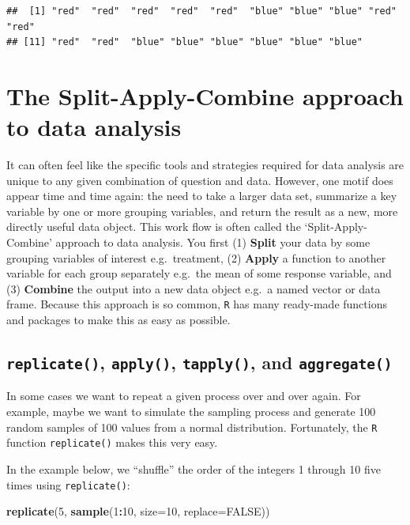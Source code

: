 \documentclass[]{book}
\newenvironment{Shaded}{\begin{snugshade}}{\end{snugshade}}
\newcommand{\DataTypeTok}[1]{\textcolor[rgb]{0.13,0.29,0.53}{#1}}
\newcommand{\DecValTok}[1]{\textcolor[rgb]{0.00,0.00,0.81}{#1}}
\newcommand{\KeywordTok}[1]{\textcolor[rgb]{0.13,0.29,0.53}{\textbf{#1}}}
\newcommand{\NormalTok}[1]{#1}
\newcommand{\OperatorTok}[1]{\textcolor[rgb]{0.81,0.36,0.00}{\textbf{#1}}}
\newcommand{\OtherTok}[1]{\textcolor[rgb]{0.56,0.35,0.01}{#1}}
\begin{document}
\begin{verbatim}
##  [1] "red"  "red"  "red"  "red"  "red"  "blue" "blue" "blue" "red"  "red" 
## [11] "red"  "red"  "blue" "blue" "blue" "blue" "blue" "blue"
\end{verbatim}

\hypertarget{the-split-apply-combine-approach-to-data-analysis}{%
\section{The Split-Apply-Combine approach to data analysis}\label{the-split-apply-combine-approach-to-data-analysis}}

It can often feel like the specific tools and strategies required for data analysis are unique to any given combination of question and data. However, one motif does appear time and time again: the need to take a larger data set, summarize a key variable by one or more grouping variables, and return the result as a new, more directly useful data object. This work flow is often called the `Split-Apply-Combine' approach to data analysis. You first (1) \textbf{Split} your data by some grouping variables of interest e.g.~treatment, (2) \textbf{Apply} a function to another variable for each group separately e.g.~the mean of some response variable, and (3) \textbf{Combine} the output into a new data object e.g.~a named vector or data frame. Because this approach is so common, \texttt{R} has many ready-made functions and packages to make this as easy as possible.

\hypertarget{replicate-apply-tapply-and-aggregate}{%
\subsection{\texorpdfstring{\texttt{replicate()}, \texttt{apply()}, \texttt{tapply()}, and \texttt{aggregate()}}{replicate(), apply(), tapply(), and aggregate()}}\label{replicate-apply-tapply-and-aggregate}}

In some cases we want to repeat a given process over and over again. For example, maybe we want to simulate the sampling process and generate 100 random samples of 100 values from a normal distribution. Fortunately, the \texttt{R} function \texttt{replicate()} makes this very easy.

In the example below, we ``shuffle'' the order of the integers 1 through 10 five times using \texttt{replicate()}:

\begin{Shaded}
\begin{Highlighting}[]
\KeywordTok{replicate}\NormalTok{(}\DecValTok{5}\NormalTok{, }\KeywordTok{sample}\NormalTok{(}\DecValTok{1}\OperatorTok{:}\DecValTok{10}\NormalTok{, }\DataTypeTok{size=}\DecValTok{10}\NormalTok{, }\DataTypeTok{replace=}\OtherTok{FALSE}\NormalTok{))}
\end{Highlighting}
\end{Shaded}
\end{document}
